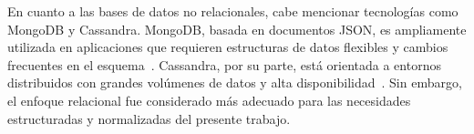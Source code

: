 En cuanto a las bases de datos no relacionales, cabe mencionar tecnologías como MongoDB y Cassandra. MongoDB, basada en documentos JSON, es ampliamente utilizada en aplicaciones que requieren estructuras de datos flexibles y cambios frecuentes en el esquema~\cite{mongodb2024}. Cassandra, por su parte, está orientada a entornos distribuidos con grandes volúmenes de datos y alta disponibilidad~\cite{cassandra2023}. Sin embargo, el enfoque relacional fue considerado más adecuado para las necesidades estructuradas y normalizadas del presente trabajo.

\vspace{1em}